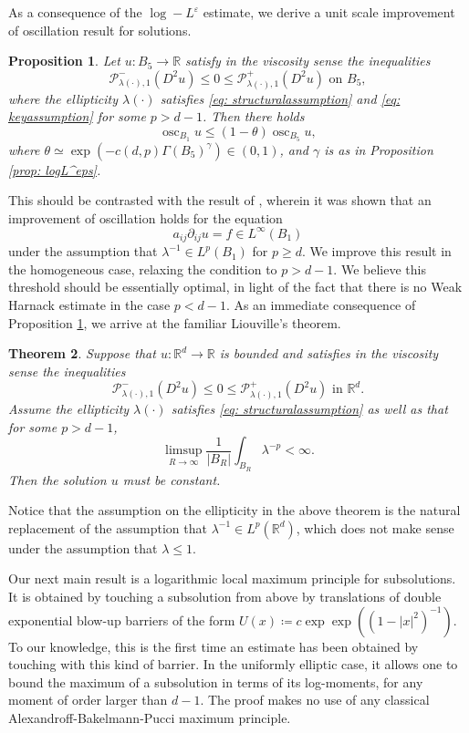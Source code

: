 \documentclass[reqno]{amsart}
\numberwithin{equation}{section}
\newtheorem{thm}{Theorem}[section]
\newtheorem{prop}[thm]{Proposition}
\numberwithin{equation}{section}
\newcommand{\R}{\mathbb R}
\newcommand{\eps}{\varepsilon}
\DeclareMathOperator*{\osc}{osc}
\newcounter{case}
\begin{document}
As a consequence of the $\log-L^\eps$ estimate, we derive a unit scale improvement of oscillation result for solutions.
\begin{prop}
\label{prop: IOL}
    Let $u:B_5 \to \R$ satisfy in the viscosity sense the inequalities
    $$\mathcal{P}^-_{\lambda(\cdot),1}(D^2u)\le 0 \le \mathcal{P}^+_{\lambda(\cdot),1}(D^2u) \text{ on } B_5,$$
    where the ellipticity $\lambda(\cdot)$ satisfies \eqref{eq: structuralassumption} and \eqref{eq: keyassumption} for some $p>d-1$. Then there holds
    $$\osc_{B_1} u \le (1-\theta) \osc_{B_5}u,$$
    where $\theta \simeq \exp(-c(d,p) \Gamma(B_5)^{\gamma}) \in (0,1)$, and $\gamma$ is as in Proposition \ref{prop: logL^eps}.
\end{prop}
This should be contrasted with the result of \cite{ArmstrongSmart2014}, wherein it was shown that an improvement of oscillation holds for the equation
$$a_{ij}\partial_{ij} u = f \in L^\infty(B_1)$$
under the assumption that $\lambda^{-1} \in L^p(B_1)$ for $p\ge d$. We improve this result in the homogeneous case, relaxing the condition to $p>d-1$. We believe this threshold should be essentially optimal, in light of the fact that there is no Weak Harnack estimate in the case $p<d-1$. 
As an immediate consequence of Proposition \ref{prop: IOL}, we arrive at the familiar Liouville's theorem.
\begin{thm}
    \label{thm: Liouville}
    Suppose that $u: \R^d \to \R$ is bounded and satisfies in the viscosity sense the inequalities
    $$\mathcal{P}^-_{\lambda(\cdot),1}(D^2u) \le 0 \le \mathcal{P}^+_{\lambda(\cdot),1}(D^2u) \text{ in } \R^d.$$
    Assume the ellipticity $\lambda(\cdot)$ satisfies \eqref{eq: structuralassumption} as well as that for some $p>d-1$, 
    $$\limsup_{R \to \infty} \frac{1}{|B_R|} \int_{B_R} \lambda^{-p} <\infty.$$
     Then the solution $u$ must be constant. 
\end{thm}
Notice that the assumption on the ellipticity in the above theorem is the natural replacement of the assumption that $\lambda^{-1}\in L^p(\R^d)$, which does not make sense under the assumption that $\lambda\le 1$.
\\\par Our next main result is a logarithmic local maximum principle for subsolutions. It is obtained by touching a subsolution from above by translations of double exponential blow-up barriers of the form $U(x) \coloneqq c\exp\exp((1-|x|^2)^{-1}).$ To our knowledge, this is the first time an estimate has been obtained by touching with this kind of barrier. In the uniformly elliptic case, it allows one to bound the maximum of a subsolution in terms of its log-moments, for any moment of order larger than $d-1$. The proof makes no use of any classical Alexandroff-Bakelmann-Pucci maximum principle.
\end{document}
